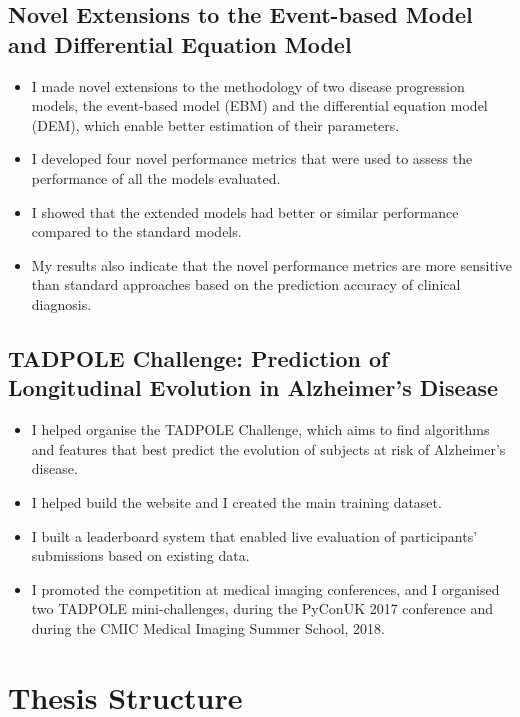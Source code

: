 \subsection{Novel Extensions to the Event-based Model and Differential Equation Model}
\begin{itemize}
 \item I made novel extensions to the methodology of two disease progression models, the event-based model (EBM) and the differential equation model (DEM), which enable better estimation of their parameters. 
 \item I developed four novel performance metrics that were used to assess the performance of all the models evaluated. 
 \item I showed that the extended models had better or similar performance compared to the standard models.
 \item My results also indicate that the novel performance metrics are more sensitive than standard approaches based on the prediction accuracy of clinical diagnosis. 
\end{itemize} 
 
\subsection{TADPOLE Challenge: Prediction of Longitudinal Evolution in Alzheimer's Disease}
\begin{itemize}
\item I helped organise the TADPOLE Challenge, which aims to find algorithms and features that best predict the evolution of subjects at risk of Alzheimer's disease.
\item I helped build the website and I created the main training dataset.
\item I built a leaderboard system that enabled live evaluation of participants' submissions based on existing data.
\item I promoted the competition at medical imaging conferences, and I organised two TADPOLE mini-challenges, during the PyConUK 2017 conference and during the CMIC Medical Imaging Summer School, 2018.
\end{itemize}
 
\section{Thesis Structure}

